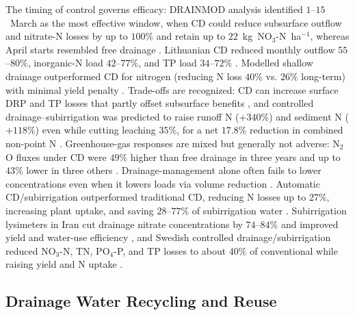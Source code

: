 The timing of control governs efficacy: DRAINMOD analysis identified
$1$--$15$~March as the most effective window, when CD could reduce
subsurface outflow and nitrate-N losses by up to $100\%$ and retain up to
$22$~kg~NO$_3$-N~ha$^{-1}$, whereas April starts resembled free drainage
\parencite{Kesicka2023c}. Lithuanian CD reduced monthly outflow
$55$--$80\%$, inorganic-N load $42$--$77\%$, and TP load $34$--$72\%$
\parencite{Povilaitis2018}. Modelled shallow drainage outperformed CD for
nitrogen (reducing N loss $40\%$ vs. $26\%$ long-term) with minimal yield
penalty \parencite{Craft2018}. Trade-offs are recognized: CD can increase
surface DRP and TP losses that partly offset subsurface benefits
\parencite{King2022,Wu2025}, and controlled drainage--subirrigation was
predicted to raise runoff N ($+340\%$) and sediment N ($+118\%$) even while
cutting leaching $35\%$, for a net $17.8\%$ reduction in combined
non-point N \parencite{SHIRMOHAMMADI1995}. Greenhouse-gas responses are
mixed but generally not adverse: N$_2$O fluxes under CD were $49\%$ higher
than free drainage in three years and up to $43\%$ lower in three others
\parencite{Madramootoo2024}. Drainage-management alone often fails to lower
concentrations even when it lowers loads via volume reduction
\parencite{Grenon2023,Wesström2014}. Automatic CD/subirrigation
outperformed traditional CD, reducing N losses up to $27\%$, increasing
plant uptake, and saving $28$--$77\%$ of subirrigation water
\parencite{Abdelbaki2025}. Subirrigation lysimeters in Iran cut drainage
nitrate concentrations by $74$--$84\%$ and improved yield and water-use
efficiency \parencite{Noory2009}, and Swedish controlled drainage/subirrigation
reduced NO$_3$-N, TN, PO$_4$-P, and TP losses to about $40\%$ of
conventional while raising yield and N uptake \parencite{Wesström2014}.

\subsection{Drainage Water Recycling and Reuse}

